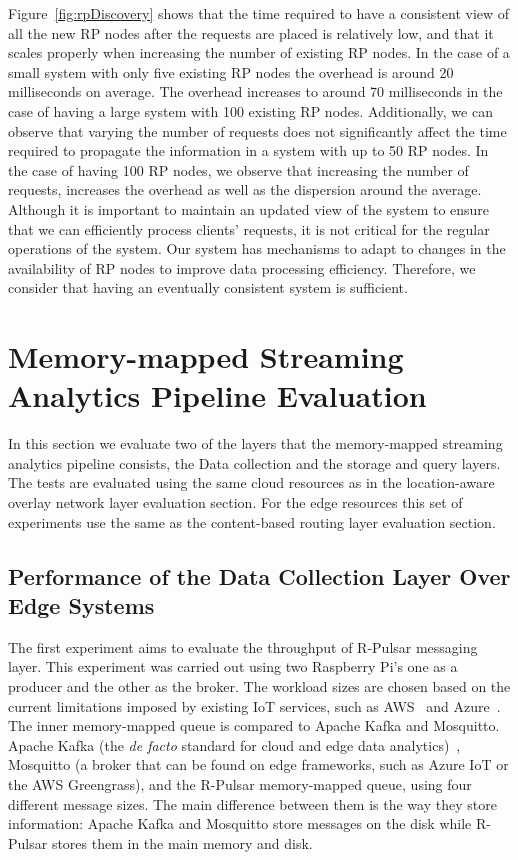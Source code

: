 Figure~\ref{fig:rpDiscovery} shows that the time required to have a consistent view of all the new RP nodes after the requests are placed is relatively low, and that it scales properly when increasing the number of existing RP nodes. In the case of a small system with only five existing RP nodes the overhead is around 20 milliseconds on average. The overhead increases to around 70 milliseconds in the case of having a large system with 100 existing RP nodes. Additionally, we can observe that varying the number of requests does not significantly affect the time required to propagate the information in a system with up to 50 RP nodes. In the case of having 100 RP nodes, we observe that increasing the number of requests, increases the overhead as well as the dispersion around the average. Although it is important to maintain an updated view of the system to ensure that we can efficiently process clients' requests, it is not critical for the regular operations of the system. Our system has mechanisms to adapt to changes in the availability of RP nodes to improve data processing efficiency. Therefore, we consider that having an eventually consistent system is sufficient. 

\section{Memory-mapped Streaming Analytics Pipeline Evaluation}

In this section we evaluate two of the layers that the memory-mapped streaming analytics pipeline consists, the Data collection and the storage and query layers. The tests are evaluated using the same cloud resources as in the location-aware overlay network layer evaluation section. For the edge resources this set of experiments use the same as the content-based routing layer evaluation section. 

\subsection{Performance of the Data Collection Layer Over Edge Systems}

The first experiment aims to evaluate the throughput of R-Pulsar messaging layer. This experiment was carried out using two Raspberry Pi's one as a producer and the other as the broker. The workload sizes are chosen based on the current limitations imposed by existing IoT services, such as AWS~\cite{AWS-MQTT} and Azure~\cite{AZURE-MQTT}. The inner memory-mapped queue is compared to Apache Kafka and Mosquitto. Apache Kafka (the \textit{de facto} standard for cloud and edge data analytics)~\cite{Young2017, firework, planner}, Mosquitto (a broker that can be found on edge frameworks, such as Azure IoT or the AWS Greengrass), and the R-Pulsar memory-mapped queue, using four different message sizes.  The main difference between them is the way they store information: Apache Kafka and Mosquitto store messages on the disk while R-Pulsar stores them in the main memory and disk. 


